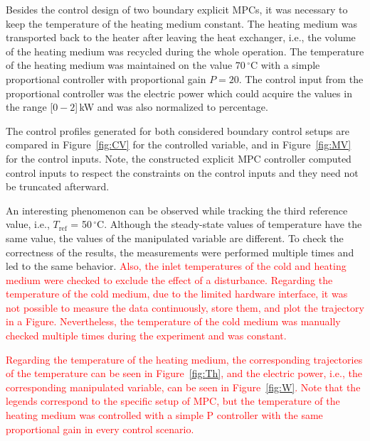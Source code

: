 \documentclass[preprint,12pt]{elsarticle}
\newcommand{\change}[1]{\textcolor{red}{#1}}
\begin{document}
Besides the control design of two boundary explicit MPCs, it was necessary to keep the temperature of the heating medium constant. The heating medium was transported back to the heater after leaving the heat exchanger, i.e., the volume of the heating medium was recycled during the whole operation. The temperature of the heating medium was maintained on the value 70\,$^{\circ}\mathrm{C}$ with a simple proportional controller with proportional gain $P = 20$. The control input from the proportional controller was the electric power which could acquire the values in the range [$0-2$]\,kW and was also normalized to percentage.

The control profiles generated for both considered boundary control setups are compared in Figure~\ref{fig:CV} for the controlled variable, and in Figure~\ref{fig:MV} for the control inputs. 
Note, the constructed explicit MPC controller computed control inputs to respect the constraints on the control inputs and they need not be truncated afterward. 

An interesting phenomenon can be observed while tracking the third reference value, i.e., $T_{\mathrm{ref}}$ = 50\,$^{\circ}\mathrm{C}$. Although the steady-state values of temperature have the same value, the values of the manipulated variable are different. To check the correctness of the results, the measurements were performed multiple times and led to the same behavior. \change{Also, the inlet temperatures of the cold and heating medium were checked to exclude the effect of a disturbance. Regarding the temperature of the cold medium, due to the limited hardware interface, it was not possible to measure the data continuously, store them, and plot the trajectory in a Figure. Nevertheless, the temperature of the cold medium was manually checked multiple times during the experiment and was constant.} 

\change{Regarding the temperature of the heating medium, the corresponding trajectories of the temperature can be seen in Figure~\ref{fig:Th}, and the electric power, i.e., the corresponding manipulated variable, can be seen in Figure~\ref{fig:W}. Note that the legends correspond to the specific setup of MPC, but the temperature of the heating medium was controlled with a simple P controller with the same proportional gain in every control scenario.} 
\end{document}
